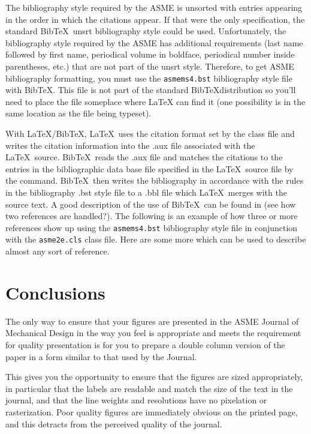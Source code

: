 \documentclass[twocolumn,10pt,journal]{asme2e}
\newcommand\BibTeX{{\sc Bib}\TeX}
\begin{document}
The bibliography style required by the ASME is unsorted with entries appearing in the order in which the citations appear.
If that were the only specification, the standard \BibTeX\ unsrt bibliography style could be used.
Unfortunately, the bibliography style required by the ASME has additional requirements (last name followed by first name, periodical volume in boldface, periodical number inside parentheses, etc.) that are not part of the unsrt style.
Therefore, to get ASME bibliography formatting, you must use the \verb+asmems4.bst+ bibliography style file with \BibTeX. This file is not part of the standard \BibTeX distribution so you'll need to place the file someplace where LaTeX can find it (one possibility is in the same location as the file being typeset).

With \LaTeX/\BibTeX, \LaTeX\ uses the citation format set by the class file and writes the citation information into the .aux file associated with the \LaTeX\ source.
\BibTeX\ reads the .aux file and matches the citations to the entries in the bibliographic data base file specified in the \LaTeX\ source file by the \verb++ command.
\BibTeX\ then writes the bibliography in accordance with the rules in the bibliography .bst style file to a .bbl file which \LaTeX\ merges with the source text.
A good description of the use of \BibTeX\ can be found in \cite{latex, goosens} (see how two references are handled?).
The following is an example of how three or more references \cite{latex, asmemanual, goosens} show up using the \verb+asmems4.bst+ bibliography style file in conjunction with the \verb+asme2e.cls+ class file.
Here are some more \cite{art, blt, ibk, icn, ips, mts, mis, pro, pts, trt, upd} which can be used to describe almost any sort of reference.

\section{Conclusions}
The only way to ensure that your figures are presented in the ASME Journal of Mechanical Design in the way you feel is appropriate and meets the requirement for quality presentation is for you to prepare a double column version of the paper in a form similar to that used by the Journal.

This gives you the opportunity to ensure that the figures are sized appropriately, in particular that the labels are readable and match the size of the text in the journal, and that the line weights and resolutions have no pixelation or rasterization.
Poor quality figures are immediately obvious on the printed page, and this detracts from the perceived quality of the journal.
\end{document}
